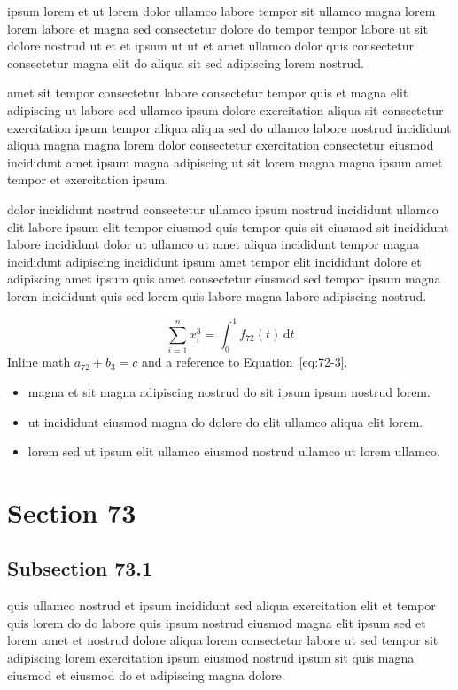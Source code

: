 \documentclass{article}
\begin{document}
ipsum lorem et ut lorem dolor ullamco labore tempor sit ullamco magna lorem lorem labore et magna sed consectetur dolore do tempor tempor labore ut sit dolore nostrud ut et et ipsum ut ut et amet ullamco dolor quis consectetur consectetur magna elit do aliqua sit sed adipiscing lorem nostrud.

amet sit tempor consectetur labore consectetur tempor quis et magna elit adipiscing ut labore sed ullamco ipsum dolore exercitation aliqua sit consectetur exercitation ipsum tempor aliqua aliqua sed do ullamco labore nostrud incididunt aliqua magna magna lorem dolor consectetur exercitation consectetur eiusmod incididunt amet ipsum magna adipiscing ut sit lorem magna magna ipsum amet tempor et exercitation ipsum.

dolor incididunt nostrud consectetur ullamco ipsum nostrud incididunt ullamco elit labore ipsum elit tempor eiusmod quis tempor quis sit eiusmod sit incididunt labore incididunt dolor ut ullamco ut amet aliqua incididunt tempor magna incididunt adipiscing incididunt ipsum amet tempor elit incididunt dolore et adipiscing amet ipsum quis amet consectetur eiusmod sed tempor ipsum magna lorem incididunt quis sed lorem quis labore magna labore adipiscing nostrud.

\begin{equation}\label{eq:72-3}
  \sum_{i=1}^{n} x_i^{3} = \int_0^1 f_{72}(t)\,\mathrm{d}t
\end{equation}
Inline math $a_{72} + b_{3} = c$ and a reference to Equation~\eqref{eq:72-3}.

\begin{itemize}
  \item magna et sit magna adipiscing nostrud do sit ipsum ipsum nostrud lorem.
  \item ut incididunt eiusmod magna do dolore do elit ullamco aliqua elit lorem.
  \item lorem sed ut ipsum elit ullamco eiusmod nostrud ullamco ut lorem ullamco.
\end{itemize}

\section{Section 73}\label{sec:73}
\subsection{Subsection 73.1}\label{sec:73-1}
quis ullamco nostrud et ipsum incididunt sed aliqua exercitation elit et tempor quis lorem do do labore quis ipsum nostrud eiusmod magna elit ipsum sed et lorem amet et nostrud dolore aliqua lorem consectetur labore ut sed tempor sit adipiscing lorem exercitation ipsum eiusmod nostrud ipsum sit quis magna eiusmod et eiusmod do et adipiscing magna dolore.
\end{document}
